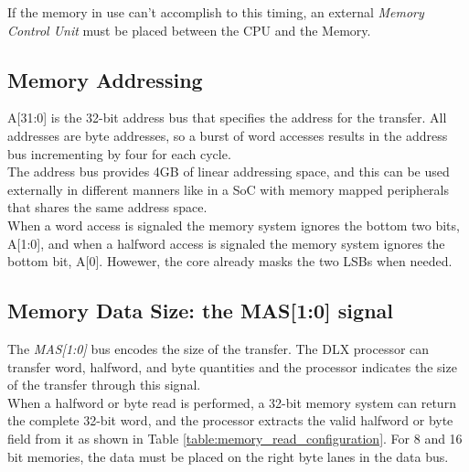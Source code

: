 If the memory in use can't accomplish to this timing, an external \emph{Memory Control Unit} must be placed between the CPU and the Memory.

\subsection{Memory Addressing}
A[31:0] is the 32-bit address bus that specifies the address for the transfer. All addresses are byte addresses, so a burst of word accesses results in the address bus incrementing by four for each cycle.\\

The address bus provides 4GB of linear addressing space, and this can be used externally in different manners like in a SoC with memory mapped peripherals that shares the same address space.\\

When a word access is signaled the memory system ignores the bottom two bits, A[1:0], and when a halfword access is signaled the memory system ignores the bottom bit, A[0]. Howewer, the core already masks the two LSBs when needed.

\subsection{Memory Data Size: the MAS[1:0] signal}

The \emph{MAS[1:0]} bus encodes the size of the transfer. The DLX processor can transfer word, halfword, and byte quantities and the processor indicates the size of the transfer through this signal.\\

When a halfword or byte read is performed, a 32-bit memory system can return the complete 32-bit word, and the processor extracts the valid halfword or byte field from it as shown in Table \ref{table:memory_read_configuration}. For 8 and 16 bit memories, the data must be placed on the right byte lanes in the data bus.


